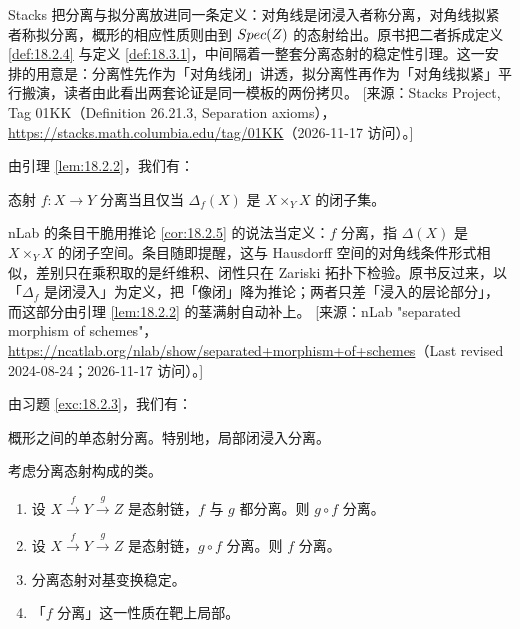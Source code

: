 \begin{yizhu}
Stacks 把分离与拟分离放进同一条定义：对角线是闭浸入者称分离，对角线拟紧者称拟分离，概形的相应性质则由到 $Spec(Z)$ 的态射给出。原书把二者拆成定义 \ref{def:18.2.4} 与定义 \ref{def:18.3.1}，中间隔着一整套分离态射的稳定性引理。这一安排的用意是：分离性先作为「对角线闭」讲透，拟分离性再作为「对角线拟紧」平行搬演，读者由此看出两套论证是同一模板的两份拷贝。
[来源：Stacks Project, Tag 01KK（Definition 26.21.3, Separation axioms），\url{https://stacks.math.columbia.edu/tag/01KK}（2026-11-17 访问）。]
\end{yizhu}

由引理 \ref{lem:18.2.2}，我们有：

\begin{corollary}\label{cor:18.2.5}
态射 $f:X\to Y$ 分离当且仅当 $\Delta_f(X)$ 是 $X\times_Y X$ 的闭子集。
\end{corollary}

\begin{yizhu}
nLab 的条目干脆用推论 \ref{cor:18.2.5} 的说法当定义：$f$ 分离，指 $\Delta(X)$ 是 $X\times_Y X$ 的闭子空间。条目随即提醒，这与 Hausdorff 空间的对角线条件形式相似，差别只在乘积取的是纤维积、闭性只在 Zariski 拓扑下检验。原书反过来，以「$\Delta_f$ 是闭浸入」为定义，把「像闭」降为推论；两者只差「浸入的层论部分」，而这部分由引理 \ref{lem:18.2.2} 的茎满射自动补上。
[来源：nLab "separated morphism of schemes"，\url{https://ncatlab.org/nlab/show/separated+morphism+of+schemes}（Last revised 2024-08-24；2026-11-17 访问）。]
\end{yizhu}

由习题 \ref{exc:18.2.3}，我们有：

\begin{corollary}\label{cor:18.2.6}
概形之间的单态射分离。特别地，局部闭浸入分离。
\end{corollary}

\begin{lemma}\label{lem:18.2.7}
考虑分离态射构成的类。
\begin{enumerate}[label=(\roman*),leftmargin=2em,itemsep=0.25ex]
  \item 设 $X\xrightarrow{f}Y\xrightarrow{g}Z$ 是态射链，$f$ 与 $g$ 都分离。则 $g\circ f$ 分离。
  \item 设 $X\xrightarrow{f}Y\xrightarrow{g}Z$ 是态射链，$g\circ f$ 分离。则 $f$ 分离。
  \item 分离态射对基变换稳定。
  \item 「$f$ 分离」这一性质在靶上局部。
\end{enumerate}
\end{lemma}

